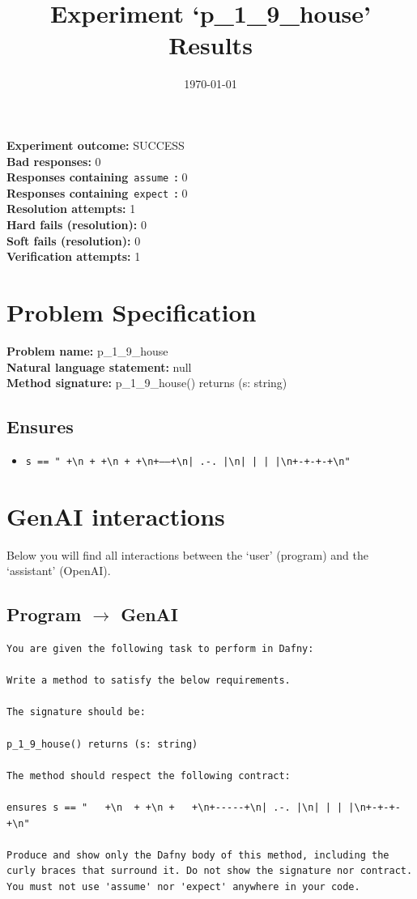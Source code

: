 \documentclass{article}
\begin{document}
\title{Experiment `p\_1\_9\_house' Results}
\author{\today}
\date{}
\maketitle
\textbf{Experiment outcome: }SUCCESS
\\\textbf{Bad responses: }0
\\\textbf{Responses containing}~\texttt{assume}~\textbf{: }0
\\\textbf{Responses containing}~\texttt{expect}~\textbf{: }0
\\\textbf{Resolution attempts: }1
\\\textbf{Hard fails (resolution): }0
\\\textbf{Soft fails (resolution): }0
\\\textbf{Verification attempts: }1
\section*{Problem Specification}
\textbf{Problem name: }p\_1\_9\_house
\\\textbf{Natural language statement: }null
\\\textbf{Method signature: }p\_1\_9\_house() returns (s: string)
\subsection*{Ensures}
\begin{itemize}
\item \texttt{s == "   +\textbackslash{}n  + +\textbackslash{}n +   +\textbackslash{}n+-----+\textbackslash{}n| .-. |\textbackslash{}n| | | |\textbackslash{}n+-+-+-+\textbackslash{}n"}
\end{itemize}
\clearpage
\section*{GenAI interactions}
Below you will find all interactions between the `user' (program) and the `assistant' (OpenAI).
\subsection*{Program $\rightarrow$ GenAI}
\begin{lstlisting}
You are given the following task to perform in Dafny:

Write a method to satisfy the below requirements.

The signature should be:

p_1_9_house() returns (s: string)

The method should respect the following contract:

ensures s == "   +\n  + +\n +   +\n+-----+\n| .-. |\n| | | |\n+-+-+-+\n"

Produce and show only the Dafny body of this method, including the curly braces that surround it. Do not show the signature nor contract. You must not use 'assume' nor 'expect' anywhere in your code.
\end{lstlisting}
\end{document}
